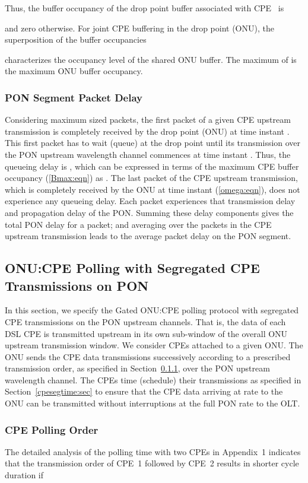 \documentclass[pdftex,journal]{IEEEtran}
\begin{document}
Thus, the buffer occupancy 
of the drop point buffer associated with CPE~ is

and zero otherwise.
For joint CPE buffering in the drop point (ONU),
the superposition of the buffer occupancies

characterizes the occupancy level of the shared ONU buffer.
The maximum of  is the maximum ONU buffer occupancy.

\subsubsection{PON Segment Packet Delay}  \label{pondelay:sec}
Considering maximum sized packets,
the first packet of a given CPE upstream transmission is completely received
by the drop point (ONU) at time instant .
This first packet has to wait (queue) at the drop point until
its transmission over the PON upstream wavelength channel commences
at time instant .
Thus, the queueing delay is ,
which can be expressed in terms of the maximum CPE buffer occupancy
 (\ref{Bmax:eqn}) as .
The last packet of the CPE upstream transmission, which is completely
received by the ONU at time instant  (\ref{omega:eqn}),
does not experience any queueing delay.
Each packet experiences that transmission delay 
and propagation delay  of the PON.
Summing these delay components gives the total PON delay for a packet;
and averaging over the packets in the CPE upstream transmission
leads to the average packet delay on the PON segment.


\subsection{ONU:CPE Polling with Segregated CPE Transmissions on PON}
\label{cpesepspec:sec}
In this section, we specify the Gated ONU:CPE polling protocol with
segregated CPE transmissions on the PON upstream channels.
That is, the data of each DSL CPE is transmitted
upstream in its own sub-window of the overall ONU upstream
transmission window.
We consider  CPEs attached to a given ONU.
The ONU sends the  CPE data transmissions successively
according to a prescribed transmission order, as
specified in Section~\ref{cpeorder:sec}, over the
PON upstream wavelength channel.
The CPEs time (schedule) their transmissions
as specified in Section~\ref{cpesegtime:sec} to ensure that
the CPE data arriving at rate  to the ONU can be transmitted
without interruptions at the full PON rate  to the OLT.

\subsubsection{CPE Polling Order} \label{cpeorder:sec}
The detailed analysis of the polling time with two CPEs in Appendix~1
indicates that the transmission order of CPE~1 followed by CPE~2 results in
shorter cycle duration if
\end{document}

